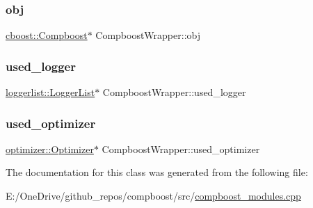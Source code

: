 \mbox{\label{class_compboost_wrapper_aa8050a2356bd99b89f829b0eabdf975c}} 
\subsubsection{\texorpdfstring{obj}{obj}}
{\footnotesize\ttfamily \mbox{\hyperlink{classcboost_1_1_compboost}{cboost\+::\+Compboost}}$\ast$ Compboost\+Wrapper\+::obj\hspace{0.3cm}{\ttfamily [private]}}

\mbox{\label{class_compboost_wrapper_afb5bff8581d3b9d9f8c0665a5ef5c028}} 
\subsubsection{\texorpdfstring{used\+\_\+logger}{used\_logger}}
{\footnotesize\ttfamily \mbox{\hyperlink{classloggerlist_1_1_logger_list}{loggerlist\+::\+Logger\+List}}$\ast$ Compboost\+Wrapper\+::used\+\_\+logger\hspace{0.3cm}{\ttfamily [private]}}

\mbox{\label{class_compboost_wrapper_a14f682d0b5d9260ee1c84d09e5c26a9c}} 
\subsubsection{\texorpdfstring{used\+\_\+optimizer}{used\_optimizer}}
{\footnotesize\ttfamily \mbox{\hyperlink{classoptimizer_1_1_optimizer}{optimizer\+::\+Optimizer}}$\ast$ Compboost\+Wrapper\+::used\+\_\+optimizer\hspace{0.3cm}{\ttfamily [private]}}



The documentation for this class was generated from the following file\+:\begin{DoxyCompactItemize}
\item 
E\+:/\+One\+Drive/github\+\_\+repos/compboost/src/\mbox{\hyperlink{compboost__modules_8cpp}{compboost\+\_\+modules.\+cpp}}\end{DoxyCompactItemize}
